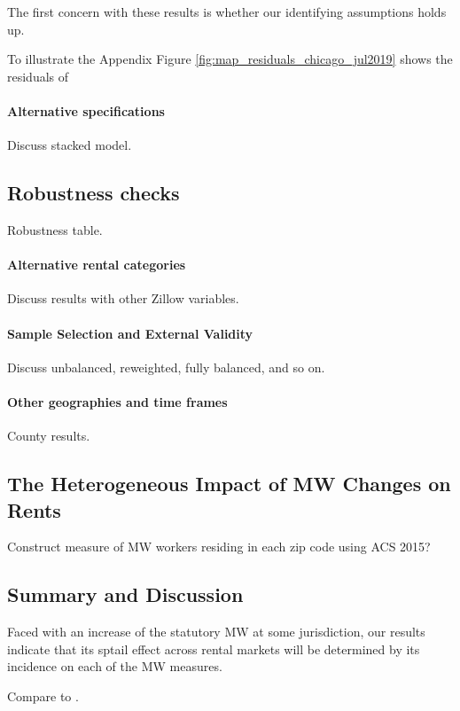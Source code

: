 The first concern with these results is whether our identifying assumptions 
holds up.

To illustrate the Appendix Figure \ref{fig:map_residuals_chicago_jul2019} shows the residuals of 

\paragraph{Alternative specifications}

Discuss stacked model.

\subsection{Robustness checks}\label{sec:robustness_results}

Robustness table.

\paragraph{Alternative rental categories}

Discuss results with other Zillow variables.

\paragraph{Sample Selection and External Validity}

Discuss unbalanced, reweighted, fully balanced, and so on.

\paragraph{Other geographies and time frames}

County results.

\subsection{The Heterogeneous Impact of MW Changes on Rents}
\label{sec:heterogeneity_results}

Construct measure of MW workers residing in each zip code using ACS 2015?

\subsection{Summary and Discussion}
\label{sec:results_discussion}

Faced with an increase of the statutory MW at some jurisdiction, our results
indicate that its sptail effect across rental markets will be determined by 
its incidence on each of the MW measures.


Compare to \textcite{Yamagishi2019}.
